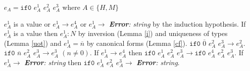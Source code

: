 \begin{case}

$e_{A}=\mathtt{if0}$ $e_{A}^{1}$ $e_{A}^{2}$ $e_{A}^{3}$ where $A\in\lbrace H,M\rbrace$

$e_{A}^{1}$ is a value or $e_{A}^{1}\rightarrow e_{A}^{4}$ or $e_{A}^{1}\rightarrow$ \emph{\textbf{Error}: string} by the induction hypothesis.  If $e_{A}^{1}$ is a value then $e_{A}^{1}:N$ by inversion (Lemma \ref{i}) and uniqueness of types (Lemma \ref{uot}) and $e_{A}^{1}=\overline{n}$ by canonical forms (Lemma \ref{cf}).  $\mathtt{if0}$ $\overline{0}$ $e_{A}^{2}$ $e_{A}^{3}\rightarrow e_{A}^{2}$.  $\mathtt{if0}$ $\overline{n}$ $e_{A}^{2}$ $e_{A}^{3}\rightarrow e_{A}^{3}$ $(n\neq 0)$.  If $e_{A}^{1}\rightarrow e_{A}^{4}$ then $\mathtt{if0}$ $e_{A}^{1}$ $e_{A}^{2}$ $e_{A}^{3}\rightarrow \mathtt{if0}$ $e_{A}^{4}$ $e_{A}^{2}$ $e_{A}^{3}$.  If $e_{A}^{1}\rightarrow$ \emph{\textbf{Error}: string} then $\mathtt{if0}$ $e_{A}^{1}$ $e_{A}^{2}$ $e_{A}^{3}\rightarrow$ \emph{\textbf{Error}: string}.

\end{case}